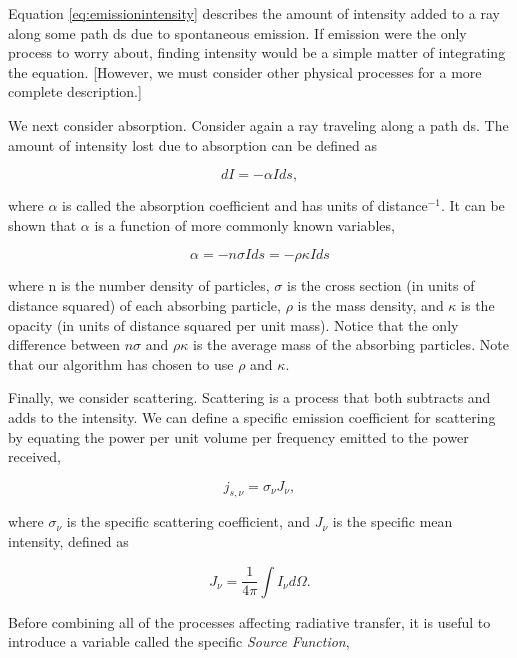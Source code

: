 Equation \ref{eq:emissionintensity} describes the amount of intensity added to a ray along some path ds due to spontaneous emission. If emission were the only process to worry about, finding intensity would be a simple matter of integrating the equation. [However, we must consider other physical processes for a more complete description.]

We next consider absorption. Consider again a ray traveling along a path ds. The amount of intensity lost due to absorption can be defined as

\begin{equation}
\label{eq:absorption}
dI = -\alpha I ds,
\end{equation}

where $\alpha$ is called the absorption coefficient and has units of distance$^{-1}$. It can be shown \citep{rybickiLightman86} that $\alpha$ is a function of more commonly known variables,

\begin{equation}
\label{eq:absorptioncoeff}
\alpha = -n \sigma I ds = -\rho \kappa I ds
\end{equation}

where n is the number density of particles, $\sigma$ is the cross section (in units of distance squared) of each absorbing particle, $\rho$ is the mass density, and $\kappa$ is the opacity (in units of distance squared per unit mass). Notice that the only difference between $n \sigma$ and $\rho \kappa$ is the average mass of the absorbing particles. Note that our algorithm has chosen to use $\rho$ and $\kappa$.

Finally, we consider scattering. Scattering is a process that both subtracts and adds to the intensity. We can define a specific emission coefficient for scattering by equating the power per unit volume per frequency emitted to the power received,

\begin{equation}
\label{eq:scatteringcoefficient}
j_{s,\nu} = \sigma_{\nu} J_{\nu},
\end{equation}

where $\sigma_{\nu}$ is the specific scattering coefficient, and $J_{\nu}$ is the specific mean intensity, defined as

\begin{equation}
\label{eq:meanintensity}
J_{\nu} = \frac{1}{4\pi}\int I_{\nu} d\Omega.
\end{equation}

Before combining all of the processes affecting radiative transfer, it is useful to introduce a variable called the specific \emph{Source Function},

